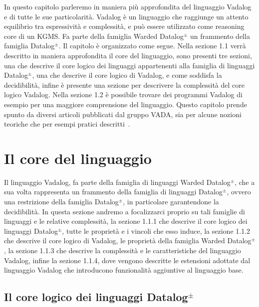 In questo capitolo parleremo in maniera più approfondita del linguaggio Vadalog e di tutte le sue particolarità. \newline
Vadalog è un linguaggio che raggiunge un attento equilibrio tra espressività e complessità, e può essere utilizzato come reasoning core di un KGMS. Fa parte della famiglia Warded Datalog$^\pm$ un frammento della famiglia Datalog$^\pm$. \newline 
Il capitolo è organizzato come segue. Nella sezione 1.1 verrà descritto in maniera approfondita il core del linguaggio, sono presenti tre sezioni, una che descrive il core logico dei linguaggi appartenenti alla famiglia di linguaggi Datalog$^\pm$, una che descrive il core logico di Vadalog, e come soddisfa la decidibilità, infine è presente una sezione per descrivere la complessità del core logico Vadalog.
Nella sezione 1.2 è possibile trovare dei programmi Vadalog di esempio per una maggiore comprensione del linguaggio. \newline
Questo capitolo prende spunto da diversi articoli pubblicati dal gruppo VADA, sia per alcune nozioni teoriche che per esempi pratici descritti~\cite{bellomarini2017swift, gottlob2015beyond}.

\section{Il core del linguaggio}

Il linguaggio Vadalog, fa parte della famiglia di linguaggi Warded Datalog$^\pm$, che a sua volta rappresenta un frammento della famiglia di linguaggi Datalog$^\pm$, ovvero una restrizione della famiglia Datalog$^\pm$, in particolare garantendone la decidibilità. \newline
In questa sezione andremo a focalizzarci proprio su tali famiglie di linguaggi e le relative complessità, la sezione 1.1.1 che descrive il core logico dei linguaggi Datalog$^\pm$, tutte le proprietà e i vincoli che esso induce, la sezione 1.1.2 che descrive il core logico di Vadalog, le proprietà della famiglia Warded Datalog$^\pm$, la sezione 1.1.3 che descrive la complessità e le caratteristiche del linguaggio Vadalog, infine la sezione 1.1.4, dove vengono descritte le estensioni adottate dal linguaggio Vadalog che introducono funzionalità aggiuntive al linguaggio base.\newline

\subsection{Il core logico dei linguaggi Datalog$^\pm$}

